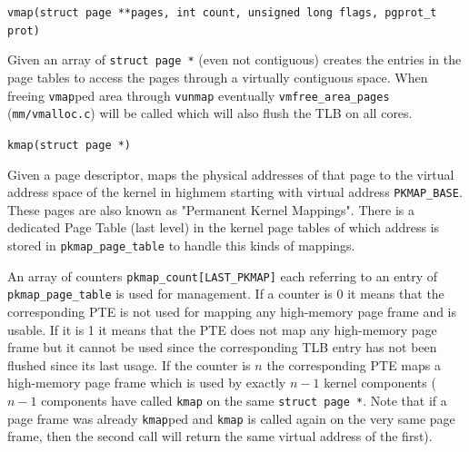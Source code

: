 \documentclass[twoside]{article}
\renewcommand{\cite}[1]{[#1]}
\begin{document}
\begin{description}
    \item \texttt{vmap(struct page **pages, int count, unsigned long flags,
        pgprot_t prot)} \marginnote{(\cite{mauerer_2010} pp. 250)}

        Given an array of \texttt{struct page *} (even not contiguous) creates
        the entries in the page tables to access the pages through a
        virtually contiguous space. When freeing \texttt{vmap}ped area through
        \texttt{vunmap} eventually \texttt{vmfree_area_pages}
        (\texttt{mm/vmalloc.c}) will be called which will also flush the TLB on
        all cores.

    \item \texttt{kmap(struct page *)} \marginnote{(\cite{mauerer_2010} Sec.
        3.5.8)}

        Given a page descriptor, maps the physical addresses of that page to
        the virtual address space of the kernel in highmem starting with virtual
        address \texttt{PKMAP_BASE}. These pages are also
        known as "Permanent Kernel Mappings". There is a dedicated Page Table
        (last level) in the kernel page tables of which address is stored in
        \texttt{pkmap_page_table} to handle this kinds of mappings.

        An array of
        counters \texttt{pkmap_count[LAST_PKMAP]} each referring to an entry of
         \\ \texttt{pkmap_page_table} is used for management. If a counter is 0 it
        means that the corresponding PTE is not used for mapping any high-memory
        page frame and is usable. If it is 1 it means that the PTE does not map any
        high-memory page frame but it cannot be used since the corresponding TLB
        entry has not been flushed since its last usage. If the counter is $n$
        the corresponding PTE maps a high-memory page frame which is used by
        exactly $n-1$ kernel components ($n-1$ components have called
        \texttt{kmap} on the same \texttt{struct page *}. Note that if a page
        frame was already \texttt{kmap}ped and \texttt{kmap} is called again on
        the very same page frame, then the second call will return the same
        virtual address of the first).


\end{description}
\end{document}
